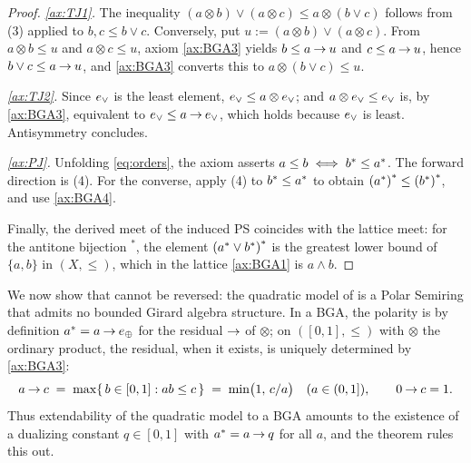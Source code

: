 \begin{proof}
\emph{\eqref{ax:TJ1}.} The inequality
$(a \otimes b) \vee (a \otimes c) \leq a \otimes (b \vee c)$ follows from
(3) applied to $b, c \leq b \vee c$. Conversely, put
$u := (a \otimes b) \vee (a \otimes c)$. From $a \otimes b \leq u$ and
$a \otimes c \leq u$, axiom \eqref{ax:BGA3} yields
$b \leq a \mathbin{\to} u$ and $c \leq a \mathbin{\to} u$, hence
$b \vee c \leq a \mathbin{\to} u$, and \eqref{ax:BGA3} converts this to
$a \otimes (b \vee c) \leq u$.

\emph{\eqref{ax:TJ2}.} Since $e_{\vee}$ is the least element,
$e_{\vee} \leq a \otimes e_{\vee}$; and $a \otimes e_{\vee} \leq e_{\vee}$ is, by
\eqref{ax:BGA3}, equivalent to $e_{\vee} \leq a \mathbin{\to} e_{\vee}$, which holds because
$e_{\vee}$ is least. Antisymmetry concludes.

\emph{\eqref{ax:PJ}.} Unfolding \eqref{eq:orders}, the axiom asserts
$a \leq b \iff {b}^{*} \leq {a}^{*}$. The forward direction is
(4). For the converse, apply
(4) to ${b}^{*} \leq {a}^{*}$ to obtain
${({a}^{*})}^{*} \leq {({b}^{*})}^{*}$, and use \eqref{ax:BGA4}.

Finally, the derived meet of the induced PS coincides with the lattice
meet: for the antitone bijection ${}^{*}$, the element
${({a}^{*} \vee {b}^{*})}^{*}$ is the greatest lower bound of
$\{a,b\}$ in $(X,\leq)$, which in the lattice \eqref{ax:BGA1} is
$a \wedge b$.
\end{proof}


We now show that  cannot be reversed: the quadratic
model of  is a Polar Semiring that admits no bounded
Girard algebra structure. In a BGA, the polarity is by definition
${a}^{*} = a \mathbin{\to} e_{\oplus}$ for the residual $\mathbin{\to}$ of $\otimes$; on
$([0,1],\leq)$ with $\otimes$ the ordinary product, the residual, when it
exists, is uniquely determined by \eqref{ax:BGA3}:
\begin{equation}\label{eq:interval-residual}
  a \mathbin{\to} c \;=\; \max\{\, b \in [0,1] : ab \leq c \,\}
          \;=\; \min\bigl(1,\, c/a\bigr)
  \quad (a \in (0,1]),
  \qquad 0 \mathbin{\to} c = 1.
\end{equation}
Thus extendability of the quadratic model to a BGA amounts to the existence
of a dualizing constant $q \in [0,1]$ with ${a}^{*} = a \mathbin{\to} q$ for all
$a$, and the theorem rules this out.

